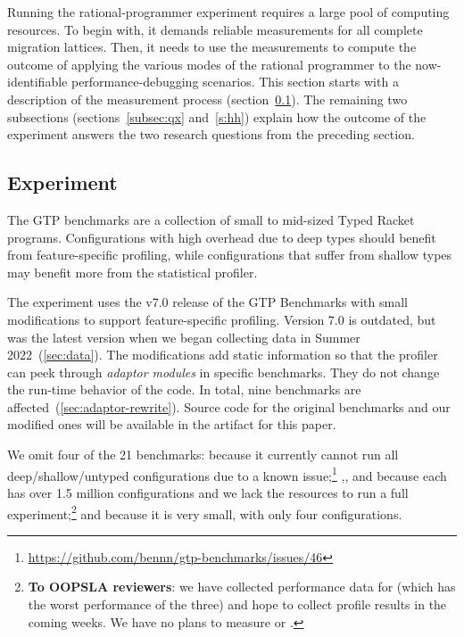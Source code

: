 \newcommand{\numgtp}{16}
\newcommand{\boundaryMB}{536} %
\newcommand{\statisticalMB}{4645} %
\newcommand{\runtimeMB}{44}

Running the rational-programmer experiment requires a large pool of computing
resources.  To begin with, it demands reliable measurements for all complete
migration lattices. Then, it needs to use the measurements to compute the
outcome of applying the various modes of the rational programmer to the
now-identifiable performance-debugging scenarios. This section starts with a
description of the measurement process (section~\ref{subsec:experiment}). The
remaining two subsections (sections~\ref{subsec:qx} and~\ref{s:hh}) explain how
the outcome of the experiment answers the two research questions from the
preceding section.

\subsection{Experiment} \label{subsec:experiment} \label{sec:data}

The GTP benchmarks are a collection of small to mid-sized Typed Racket programs.
Configurations with high overhead due to deep types should benefit from
feature-specific profiling, while configurations that suffer from shallow
types may benefit more from the statistical profiler.

The experiment uses the v7.0 release of the GTP Benchmarks with small modifications
to support feature-specific profiling.
Version 7.0 is outdated, but was the latest version when we began collecting
data in Summer 2022~(\cref{sec:data}).
The modifications add static information so that the profiler can peek through
\emph{adaptor modules} in specific benchmarks.
They do not change the run-time behavior of the code.
In total, nine benchmarks are affected~(\cref{sec:adaptor-rewrite}).
Source code for the original benchmarks and our modified ones will be available
in the artifact for this paper.

We omit four of the 21 benchmarks:
 because it currently cannot run all deep/shallow/untyped configurations
due to a known issue;\footnote{\url{https://github.com/bennn/gtp-benchmarks/issues/46}}
,, and  because each has over 1.5
million configurations and we lack the resources to run a full experiment;\footnote{
\textbf{To OOPSLA reviewers}: we have collected performance data for
 (which has the worst performance of the three) and hope to
collect profile results in the coming weeks.  We have no plans to measure
 or .
}
and  because it is very small, with only four configurations.


